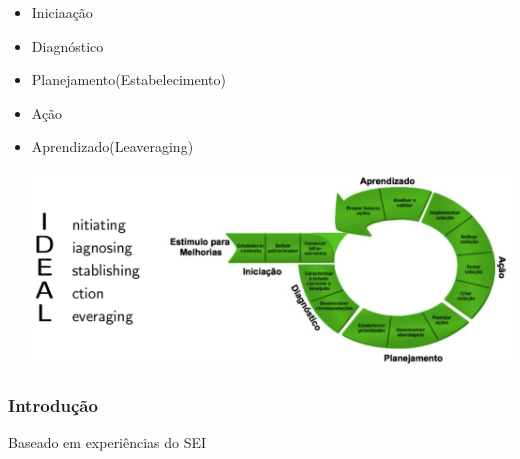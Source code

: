 \documentclass{article}
\begin{document}
	\begin{itemize}
	\item Iniciaação
	\item Diagnóstico
	\item Planejamento(Estabelecimento)
	\item Ação
	\item Aprendizado(Leaveraging)
	\begin{center}
	\includegraphics[scale=0.4]{IDEAL}	
	\end{center}
	
	\end{itemize}

\subsubsection{Introdução}
	Baseado em experiências do SEI
\end{document}
